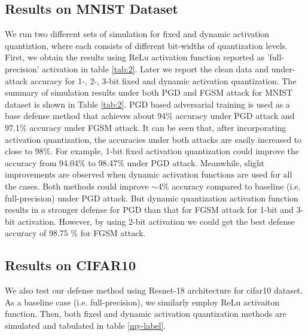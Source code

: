 \documentclass{article}
\begin{document}
\subsection{Results on MNIST Dataset}
We run two different sets of simulation for fixed and dynamic activation quantiztion, where each consists of different bit-widths of quantization levels. First, we obtain the results using ReLu activation function reported as 'full-precision' activation in table \ref{tab:2}. Later we report the clean data and under-attack accuracy for 1-, 2-, 3-bit fixed and dynamic activation quantization. The summary of simulation results under both PGD and FGSM attack for MNIST dataset is shown in Table \ref{tab:2}. PGD based adversarial training is used as a base defense method that achieves about 94\% accuracy under PGD attack and 97.1\% accuracy under FGSM attack. It can be seen that, after incorporating activation quantization, the accuracies under both attacks are easily increased to close to 98\%. For example, 1-bit fixed activation quantization could improve the accuracy from 94.04\% to 98.47\% under PGD attack. Meanwhile, slight improvements are observed when dynamic activation functions are used for all the cases. Both methods could improve $\sim$4\% accuracy compared to baseline (i.e. full-precision) under PGD attack. But dynamic quantization activation function results in a stronger defense for PGD than that for FGSM attack for 1-bit and 3-bit activation. However, by using 2-bit activation we could get the best defense accuracy of 98.75 \%  for FGSM attack. 

 

\subsection{Results on CIFAR10}
We also test our defense method using Resnet-18 architecture for cifar10 dataset. As a baseline case (i.e. full-precision), we similarly employ ReLu activaiton function. Then, both fixed and dynamic activation quantization methods are simulated and tabulated in table \ref{my-label}.
\end{document}
